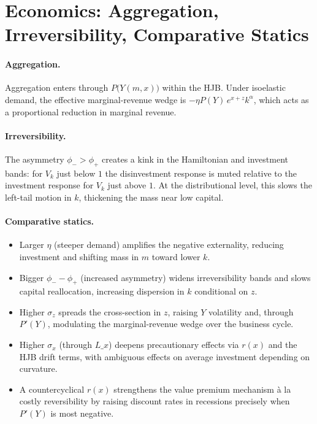﻿\documentclass[11pt,letterpaper,oneside]{article}
\numberwithin{equation}{section}
\newcommand{\1}{\mathbf{1}}
\newcommand{\Lx}{L\_x}
\begin{document}
\section{Economics: Aggregation, Irreversibility, Comparative Statics}

\paragraph{Aggregation.}
Aggregation enters through $P\big(Y(m,x)\big)$ within the HJB. Under isoelastic demand, the effective marginal-revenue wedge is $-\eta P(Y)\,e^{x+z}k^\alpha$, which acts as a proportional reduction in marginal revenue.

\paragraph{Irreversibility.}
The asymmetry $\phi_->\phi_+$ creates a kink in the Hamiltonian and investment bands: for $V_k$ just below $1$ the disinvestment response is muted relative to the investment response for $V_k$ just above $1$. At the distributional level, this slows the left-tail motion in $k$, thickening the mass near low capital.

\paragraph{Comparative statics.}
\begin{itemize}[leftmargin=1.25em]
\item Larger $\eta$ (steeper demand) amplifies the negative externality, reducing investment and shifting mass in $m$ toward lower $k$.
\item Bigger $\phi_- - \phi_+$ (increased asymmetry) widens irreversibility bands and slows capital reallocation, increasing dispersion in $k$ conditional on $z$.
\item Higher $\sigma_z$ spreads the cross-section in $z$, raising $Y$ volatility and, through $P'(Y)$, modulating the marginal-revenue wedge over the business cycle.
\item Higher $\sigma_x$ (through $\Lx$) deepens precautionary effects via $r(x)$ and the HJB drift terms, with ambiguous effects on average investment depending on curvature.
\item A countercyclical $r(x)$ strengthens the value premium mechanism à la costly reversibility by raising discount rates in recessions precisely when $P'(Y)$ is most negative.
\end{itemize}
\end{document}
